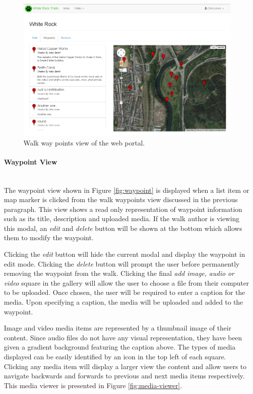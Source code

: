 \documentclass[11pt,a4paper]{report}
\begin{document}
\begin{figure}[H]

\centering

\includegraphics[width=1\linewidth]{./img/webportal/walk-waypoints}

\caption{Walk way points view of the web portal.}

\label{fig:walk-waypoints}

\end{figure}

\paragraph{Waypoint View}\mbox{}\\
The waypoint view shown in Figure \ref{fig:waypoint} is displayed when a list item or map marker is clicked from the walk waypoints view discussed in the previous paragraph. This view shows a read only representation of waypoint information such as its title, description and uploaded media. If the walk author is viewing this modal, an \emph{edit} and \emph{delete} button will be shown at the bottom which allows them to modify the waypoint. 

Clicking the \emph{edit} button will hide the current modal and display the waypoint in edit mode. Clicking the \emph{delete} button will prompt the user before permanently removing the waypoint from the walk. Clicking the final \emph{add image, audio or video} square in the gallery will allow the user to choose a file from their computer to be uploaded. Once chosen, the user will be required to enter a caption for the media. Upon specifying a caption, the media will be uploaded and added to the waypoint. 

Image and video media items are represented by a thumbnail image of their content. Since audio files do not have any visual representation, they have been given a gradient background featuring the caption above. The types of media displayed can be easily identified by an icon in the top left of each square. Clicking any media item will display a larger view the content and allow users to navigate backwards and forwards to previous and next media items respectively. This media viewer is presented in Figure \ref{fig:media-viewer}.
\end{document}
